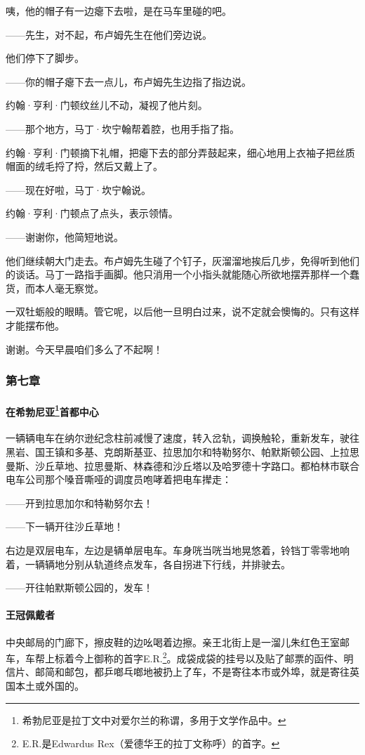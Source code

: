 \par 咦，他的帽子有一边瘪下去啦，是在马车里碰的吧。
\par ——先生，对不起，布卢姆先生在他们旁边说。
\par 他们停下了脚步。
\par ——你的帽子瘪下去一点儿，布卢姆先生边指了指边说。
\par 约翰·亨利·门顿纹丝儿不动，凝视了他片刻。
\par ——那个地方，马丁·坎宁翰帮着腔，也用手指了指。
\par 约翰·亨利·门顿摘下礼帽，把瘪下去的部分弄鼓起来，细心地用上衣袖子把丝质帽面的绒毛捋了捋，然后又戴上了。
\par ——现在好啦，马丁·坎宁翰说。
\par 约翰·亨利·门顿点了点头，表示领情。
\par ——谢谢你，他简短地说。
\par 他们继续朝大门走去。布卢姆先生碰了个钉子，灰溜溜地挨后几步，免得听到他们的谈话。马丁一路指手画脚。他只消用一个小指头就能随心所欲地摆弄那样一个蠢货，而本人毫无察觉。
\par 一双牡蛎般的眼睛。管它呢，以后他一旦明白过来，说不定就会懊悔的。只有这样才能摆布他。
\par 谢谢。今天早晨咱们多么了不起啊！



\subsubsection*{第七章}

\paragraph*{在希勃尼亚\footnote{希勃尼亚是拉丁文中对爱尔兰的称谓，多用于文学作品中。}首都中心}
\par 一辆辆电车在纳尔逊纪念柱前减慢了速度，转入岔轨，调换触轮，重新发车，驶往黑岩、国王镇和多基、克朗斯基亚、拉思加尔和特勒努尔、帕默斯顿公园、上拉思曼斯、沙丘草地、拉思曼斯、林森德和沙丘塔以及哈罗德十字路口。都柏林市联合电车公司那个嗓音嘶哑的调度员咆哮着把电车撵走：
\par ——开到拉思加尔和特勒努尔去！
\par ——下一辆开往沙丘草地！
\par 右边是双层电车，左边是辆单层电车。车身咣当咣当地晃悠着，铃铛丁零零地响着，一辆辆地分别从轨道终点发车，各自拐进下行线，并排驶去。
\par ——开往帕默斯顿公园的，发车！
\paragraph*{王冠佩戴者}
\par 中央邮局的门廊下，擦皮鞋的边吆喝着边擦。亲王北街上是一溜儿朱红色王室邮车，车帮上标着今上御称的首字E.R.\footnote{E.R.是Edwardus Rex（爱德华王的拉丁文称呼）的首字。}。成袋成袋的挂号以及贴了邮票的函件、明信片、邮简和邮包，都乒啷乓啷地被扔上了车，不是寄往本市或外埠，就是寄往英国本土或外国的。
